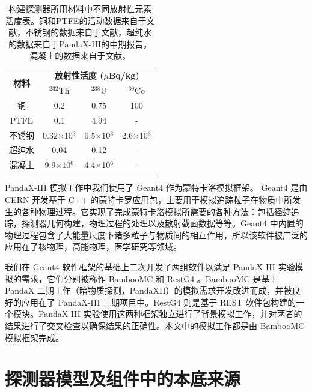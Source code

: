 \renewcommand\arraystretch{1.4}
\begin{table}[tbh]
    \centering
    \caption{构建探测器所用材料中不同放射性元素活度表。铜和PTFE的活动数据来自于文献\cite{Abgrall:2016cct}，不锈钢的数据来自于文献\cite{LZ_CDR}，超纯水的数据来自于PandaX-III的中期报告\cite{cdr}，混凝土的数据来自于文献\cite{Zeng2014}。}
    \begin{tabular*}{0.75\textwidth}{@{\extracolsep{\fill}}cccc}
        \hline
        \hline
        \multirow{2}{*}{\textbf{材料}} & \multicolumn{3}{c}{\textbf{放射性活度 ($\mu$Bq/kg)}}\\
            & $^{232}$Th & $^{238}$U  & $^{60}$Co \\ \hline
        铜      & 0.2        &   0.75     &     100     \\
        PTFE    & 0.1        &   4.94      &    -      \\
        不锈钢  & 0.32$\times$10$^3$          &    0.5$\times$10$^3$      &     2.6$\times$10$^3$     \\
        超纯水  & 0.04          &     0.12      &     -     \\
        混凝土  & 9.9$\times$10$^6$          &    4.4$\times$10$^6$   &    -    \\
        \hline
        \hline
    \end{tabular*}
    \label{tab:activities}
\end{table}
  

PandaX-III 模拟工作中我们使用了 Geant4 作为蒙特卡洛模拟框架。 Geant4 是由 CERN 开发基于 C++ 的蒙特卡罗应用包，主要用于模拟追踪粒子在物质中所发生的各种物理过程。它实现了完成蒙特卡洛模拟所需要的各种方法：包括径迹追踪，探测器几何构建，物理过程的处理以及散射截面数据等等。Geant4 中内置的物理过程包含了大能量尺度下诸多粒子与物质间的相互作用，所以该软件被广泛的应用在了核物理，高能物理，医学研究等领域。

我们在 Geant4 软件框架的基础上二次开发了两组软件以满足 PandaX-III 实验模拟的需求，它们分别被称作 BambooMC 和 RestG4 。BambooMC 是基于 PandaX 二期工作（暗物质探测，PandaXII）的模拟需求开发改进而成，并被良好的应用在了 PandaX-III 三期项目中。RestG4 则是基于 REST \supercite{tomas2013development} 软件包构建的一个模块。PandaX-III 实验使用这两种框架独立进行了背景模拟工作，并对两者的结果进行了交叉检查以确保结果的正确性。本文中的模拟工作都是由 BambooMC 模拟框架完成。

\section{探测器模型及组件中的本底来源}

